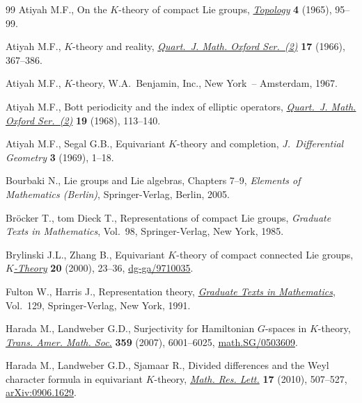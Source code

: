 \documentclass[11pt]{article}
\numberwithin{equation}{section}
\begin{document}
\begin{thebibliography}{99}
Atiyah M.F., On the {$K$}-theory of compact {L}ie groups, \href{http://dx.doi.org/10.1016/0040-9383(65)90051-0}{\textit{Topology}}
  \textbf{4} (1965), 95--99.

Atiyah M.F., {$K$}-theory and reality, \href{http://dx.doi.org/10.1093/qmath/17.1.367}{\textit{Quart.~J. Math. Oxford Ser.~(2)}}
  \textbf{17} (1966), 367--386.

Atiyah M.F., {$K$}-theory, W.A.~Benjamin, Inc., New York~-- Amsterdam, 1967.

Atiyah M.F., Bott periodicity and the index of elliptic operators,
  \href{http://dx.doi.org/10.1093/qmath/19.1.113}{\textit{Quart.~J. Math. Oxford Ser.~(2)}} \textbf{19} (1968), 113--140.

Atiyah M.F., Segal G.B., Equivariant {$K$}-theory and completion,
  \textit{J.~Differential Geometry} \textbf{3} (1969), 1--18.

Bourbaki N., Lie groups and {L}ie algebras, {C}hapters 7--9, \textit{Elements of
  Mathematics (Berlin)}, Springer-Verlag, Berlin, 2005.

Br{\"o}cker T., tom Dieck T., Representations of compact {L}ie groups,
  \textit{Graduate Texts in Mathematics}, Vol.~98, Springer-Verlag, New York,
  1985.

Brylinski J.L., Zhang B., Equivariant {$K$}-theory of compact connected {L}ie
  groups, \href{http://dx.doi.org/10.1023/A:1007824116324}{\textit{$K$-Theory}} \textbf{20} (2000), 23--36,
  \href{http://arxiv.org/abs/dg-ga/9710035}{dg-ga/9710035}.

Fulton W., Harris J., Representation theory, \href{http://dx.doi.org/10.1007/978-1-4612-0979-9}{\textit{Graduate Texts in
  Mathematics}}, Vol.~129, Springer-Verlag, New York, 1991.

Harada M., Landweber G.D., Surjectivity for {H}amiltonian {$G$}-spaces in
  {$K$}-theory, \href{http://dx.doi.org/10.1090/S0002-9947-07-04164-5}{\textit{Trans. Amer. Math. Soc.}} \textbf{359} (2007),
  6001--6025, \href{http://arxiv.org/abs/math.SG/0503609}{math.SG/0503609}.

Harada M., Landweber G.D., Sjamaar R., Divided dif\/ferences and the {W}eyl
  character formula in equivariant {$K$}-theory, \href{http://dx.doi.org/10.4310/MRL.2010.v17.n3.a10}{\textit{Math. Res. Lett.}}
  \textbf{17} (2010), 507--527, \href{http://arxiv.org/abs/0906.1629}{arXiv:0906.1629}.


\end{thebibliography}
\end{document}
